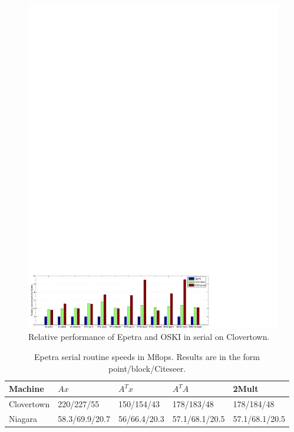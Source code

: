 \begin{figure}[htbp]
\begin{center}
\includegraphics[scale=.8]{./plots/c3serial.pdf}
\caption{Relative performance of Epetra and OSKI in serial on Clovertown.}
\label{IK:fig:C3serial}
\end{center}
\end{figure}
%
\begin{table}[htbp]
\begin{center}
\begin{tabular}{|l|l|l|l|l|}
\hline
Machine & $Ax$ & $A^Tx$ & $A^TA$ & 2Mult \\
\hline
Clovertown & 220/227/55 & 150/154/43 & 178/183/48 & 178/184/48 \\
Niagara & 58.3/69.9/20.7 & 56/66.4/20.3 & 57.1/68.1/20.5 & 57.1/68.1/20.5 \\
\hline
\end{tabular}
\caption{Epetra serial routine speeds in Mflops.  Results are in the form point/block/Citeseer.}
\label{IK:fig:serialnums}
\end{center}
\end{table}

